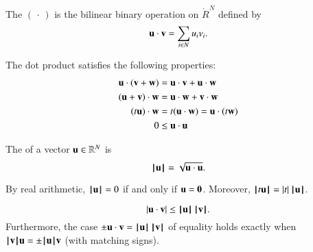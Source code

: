 \begin{definition}
\label{def:dot}
The   $(\,\cdot\,)$ is the
 bilinear binary operation on $\ring{R}^N$
defined by
\begin{displaymath}
\u\cdot \v = \sum_{i\in N} u_i v_i.
\end{displaymath}
%
%
\end{definition}


The dot product satisfies the following
properties:
\begin{align}\label{eqn:dot}
\u \cdot (\v + \w) &= \u \cdot \v + \u \cdot \w\nonumber\\
(\u + \v)\cdot \w &= \u \cdot \w + \v \cdot \w\nonumber\\
(t \u)\cdot \w &= t(\u \cdot \w) = \u \cdot (t \w)\\
0 &\le \u\cdot \u\nonumber
\end{align}


\begin{definition}[norm]
\label{def:norm}
The  of a vector $\u\in\ring{R}^N$ is
\begin{displaymath}\normo{\u} = \sqrt{\u\cdot \u}.\end{displaymath}
%
\end{definition}

By  real arithmetic,
$\normo{\u}=0$  if and only if $\u=\orz$.  Moreover,
$\normo{ t \u } = |t| \, \normo{\u}$.   



\begin{lemma}
  \begin{displaymath}|\u \cdot \v| \le
    \normo{\u}\,\normo{\v}.\end{displaymath} Furthermore, the case
  $\pm \u\cdot \v = \normo{\u}\,\normo{\v}$ of equality holds exactly
  when $\normo{\v} \u = \pm\normo{\u} \v$ (with matching signs).
\end{lemma}
%

